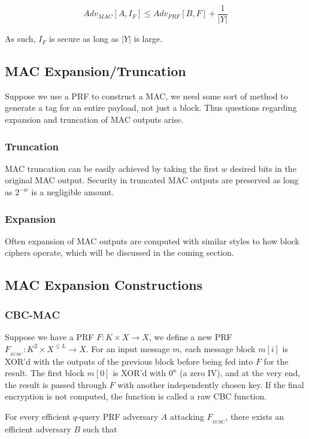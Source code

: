 \documentclass{article}
\begin{document}
\begin{multicols}{2}
$$
Adv_{MAC}[A,I_F] \leq Adv_{PRF}[B,F] + \frac{1}{|Y|}
$$

As such, $I_F$ is secure as long as $|Y|$ is large.

\subsection{MAC Expansion/Truncation}

Suppose we use a PRF to construct a MAC, we need some sort of method to generate a tag for an entire payload, not just a block. Thus questions regarding expansion and truncation of MAC outputs arise.

\subsubsection{Truncation}

MAC truncation can be easily achieved by taking the first $w$ desired bits in the original MAC output. Security in truncated MAC outputs are preserved as long as $2^{-w}$ is a negligible amount.

\subsubsection{Expansion}

Often expansion of MAC outputs are computed with similar styles to how block ciphers operate, which will be discussed in the coming section.


\subsection{MAC Expansion Constructions}

\subsubsection{CBC-MAC}

Suppose we have a PRF $F: K \times X \rightarrow X$, we define a new PRF $F_{_{ECBC}} : K^2 \times X^{\leq L} \rightarrow X$. For an input message $m$, each message block $m[i]$ is XOR'd with the outputs of the previous block before being fed into $F$ for the result. The first block $m[0]$ is XOR'd with $0^n$ (a zero IV), and at the very end, the result is passed through $F$ with another independently chosen key. If the final encryption is not computed, the function is called a raw CBC function.

For every efficient $q$-query PRF adversary $A$ attacking $F_{_{ECBC}}$, there exists an efficient adversary $B$ such that


\end{multicols}
\end{document}
